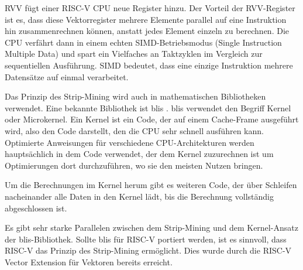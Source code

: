 
RVV fügt einer RISC-V CPU neue Register hinzu. Der Vorteil der \gls{RVV}-Register ist es, dass diese Vektorregister mehrere Elemente parallel auf eine Instruktion hin zusammenrechnen können, anstatt jedes Element einzeln zu berechnen. Die CPU verfährt dann in einem echten \gls{SIMD}-Betriebsmodus (Single Instruction Multiple Data) und spart ein Vielfaches an Taktzyklen im Vergleich zur sequentiellen Ausführung. SIMD bedeutet, dass eine einzige Instruktion mehrere Datensätze auf einmal verarbeitet.



Das Prinzip des Strip-Mining wird auch in mathematischen Bibliotheken verwendet. Eine bekannte Bibliothek ist blis \cite{BLIS1}. blis verwendet den Begriff Kernel oder Microkernel. Ein Kernel ist ein Code, der auf einem Cache-Frame ausgeführt wird, also den Code darstellt, den die CPU sehr schnell ausführen kann. Optimierte Anweisungen für verschiedene CPU-Architekturen werden hauptsächlich in dem Code verwendet, der dem Kernel zuzurechnen ist um Optimierungen dort durchzuführen, wo sie den meisten Nutzen bringen.

Um die Berechnungen im Kernel herum gibt es weiteren Code, der über Schleifen nacheinander alle Daten in den Kernel lädt, bis die Berechnung vollständig abgeschlossen ist.

Es gibt sehr starke Parallelen zwischen dem Strip-Mining und dem Kernel-Ansatz der blis-Bibliothek. Sollte blis für RISC-V portiert werden, ist es sinnvoll, dass RISC-V das Prinzip des Strip-Mining ermöglicht. Dies wurde durch die RISC-V Vector Extension für Vektoren bereits erreicht.



